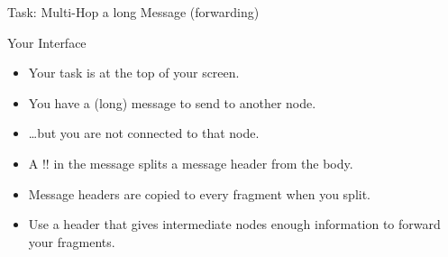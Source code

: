 \documentclass[svgnames]{beamer}
\begin{document}
\begin{frame}{Task: Multi-Hop a long Message (forwarding)}
\begin{block}{Your Interface}
\begin{itemize}
\item Your task is at the top of your screen.
\item You have a (long) message to send to another node.
\item \dots but you are not connected to that node.
\item A \alert{!!} in the message splits a message header from the body.
\item Message headers are copied to every fragment when you \alert{split}.
\item Use a header that gives intermediate nodes enough information to forward your fragments.
\end{itemize}
\end{block}
\end{frame}
\end{document}
